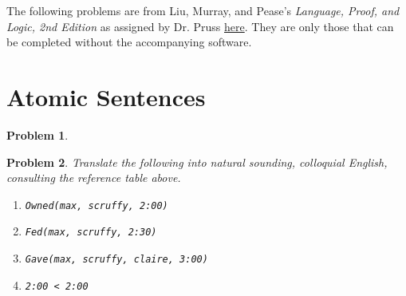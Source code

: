 \documentclass[12pt]{article}
\newtheorem{problem}{Problem}
\theoremstyle{remark}  %
\begin{document}
 
%

\rhead{\today}
The following problems are from Liu, Murray, and Pease's \textit{Language, Proof, and Logic, 2nd Edition} as assigned by Dr. Pruss \hyperlink{http://alexanderpruss.com/classes/intlogic/}{here}. They are only those that can be completed without the accompanying software.

\section{Atomic Sentences}
\setcounter{problem}{9}
    \begin{problem}
        
    \end{problem}
\vspace{.5em}

\setcounter{problem}{12}
    \begin{problem}
        Translate the following into natural sounding, colloquial English, consulting the reference table above.
        \begin{enumerate}
            \item \texttt{Owned(max, scruffy, 2:00)}
            \item \texttt{Fed(max, scruffy, 2:30)}
            \item \texttt{Gave(max, scruffy, claire, 3:00)}
            \item \texttt{2:00 < 2:00}
        \end{enumerate}
    \end{problem}
\vspace{.5em}
\end{document}
